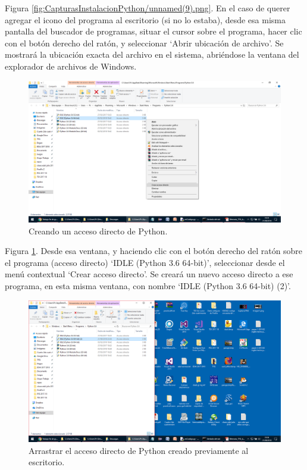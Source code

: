 Figura \ref{fig:CapturasInstalacionPython/unnamed(9).png}. En el caso de querer agregar el icono del programa al escritorio (si no lo estaba), desde esa misma pantalla del buscador de programas, situar el cursor sobre el programa, hacer clic con el botón derecho del ratón, y seleccionar ‘Abrir ubicación de archivo’. Se mostrará la ubicación exacta del archivo en el sistema, abriéndose la ventana del explorador de archivos de Windows.\\[20pt]

\begin{figure}[h!]
  	\centering
	\includegraphics[width=\textwidth]{CapturasInstalacionPython/unnamed(10).png}
	\caption{Creando un acceso directo de Python.
	\label{fig:CapturasInstalacionPython/unnamed(10).png}}
\end{figure}

Figura \ref{fig:CapturasInstalacionPython/unnamed(10).png}. Desde esa ventana, y haciendo clic con el botón derecho del ratón sobre el programa (acceso directo) ‘IDLE (Python 3.6 64-bit)’, seleccionar desde el menú contextual ‘Crear acceso directo’. Se creará un nuevo acceso directo a ese programa, en esta misma ventana, con nombre ‘IDLE (Python 3.6 64-bit) (2)’.\\[20pt]

\begin{figure}[h!]
  	\centering
	\includegraphics[width=\textwidth]{CapturasInstalacionPython/unnamed(11).png}
	\caption{Arrastrar el acceso directo de Python creado previamente al escritorio.
	\label{fig:CapturasInstalacionPython/unnamed(11).png}}
\end{figure}

